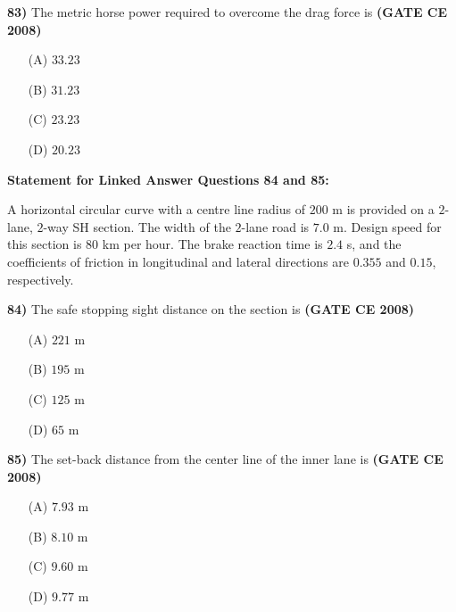 \documentclass[journal]{IEEEtran}
\begin{document}
\begin{enumerate}
\textbf{83)} The metric horse power required to overcome the drag force is \textbf{(GATE CE 2008)}
\begin{itemize}
    \item[(A)] $33.23$
    \item[(B)] $31.23$
    \item[(C)] $23.23$
    \item[(D)] $20.23$
\end{itemize}

\vspace{0.5cm}
\textbf{Statement for Linked Answer Questions 84 and 85:}

A horizontal circular curve with a centre line radius of $200$ m is provided on a $2$-lane, $2$-way SH section. The width of the $2$-lane road is $7.0$ m. Design speed for this section is $80$ km per hour. The brake reaction time is $2.4$ s, and the coefficients of friction in longitudinal and lateral directions are $0.355$ and $0.15$, respectively.
\vspace{0.1cm}

\textbf{84)} The safe stopping sight distance on the section is \textbf{(GATE CE 2008)}
\begin{itemize}
    \item[(A)] $221$ m
    \item[(B)] $195$ m
    \item[(C)] $125$ m
    \item[(D)] $65$ m
\end{itemize}

\textbf{85)} The set-back distance from the center line of the inner lane is \textbf{(GATE CE 2008)}
\begin{itemize}
    \item[(A)] $7.93$ m
    \item[(B)] $8.10$ m
    \item[(C)] $9.60$ m
    \item[(D)] $9.77$ m
\end{itemize}


\end{enumerate}
\end{document}
